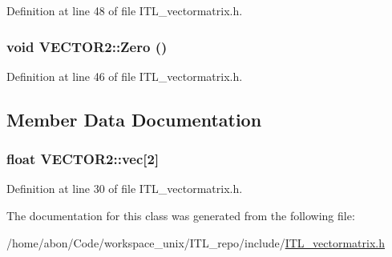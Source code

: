 Definition at line 48 of file ITL\_\-vectormatrix.h.

\hypertarget{classVECTOR2_aa1c6e9606376454625184342925a6fce}{
\subsubsection[{Zero}]{\setlength{\rightskip}{0pt plus 5cm}void VECTOR2::Zero ()}}
\label{classVECTOR2_aa1c6e9606376454625184342925a6fce}


Definition at line 46 of file ITL\_\-vectormatrix.h.



\subsection{Member Data Documentation}
\hypertarget{classVECTOR2_a2a652a951bed082365807c39e702d79a}{
\subsubsection[{vec}]{\setlength{\rightskip}{0pt plus 5cm}float {\bf VECTOR2::vec}\mbox{[}2\mbox{]}}}
\label{classVECTOR2_a2a652a951bed082365807c39e702d79a}


Definition at line 30 of file ITL\_\-vectormatrix.h.



The documentation for this class was generated from the following file:\begin{DoxyCompactItemize}
\item 
/home/abon/Code/workspace\_\-unix/ITL\_\-repo/include/\hyperlink{ITL__vectormatrix_8h}{ITL\_\-vectormatrix.h}\end{DoxyCompactItemize}
